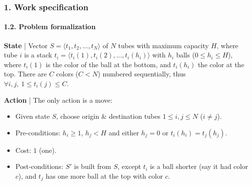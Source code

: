 \documentclass{beamer}
\begin{document}
\begin{frame}
\frametitle{1. Work specification}
\framesubtitle{1.2. Problem formalization}

\textbf{State} | Vector $S = \langle t_1, t_2, ..., t_N \rangle$ of $N$ tubes with maximum capacity $H$, where tube $i$ is a stack $t_i = \langle t_i(1), t_i(2), ..., t_i(h_i) \rangle$ with $h_i$ balls ($0 \leq h_i \leq H$), where $t_i(1)$ is the color of the ball at the bottom, and $t_i(h_i)$ the color at the top. There are $C$ colors ($C < N$) numbered sequentially, thus $\forall i, j,~1 \leq t_i(j) \leq C$.

\textbf{Action} | The only action is a move:
\begin{itemize}
  \item Given state $S$, choose origin \& destination tubes $1 \leq i, j \leq N$ ($i \neq j$).
  \item Pre-conditions: $h_i \geq 1$, $h_j < H$ and either $h_j = 0$ or $t_i(h_i)=t_j(h_j)$.
  \item Cost: $1$ (one).
  \item Post-conditions: $S'$ is built from $S$, except $t_i$ is a ball shorter (say it had color $c$), and $t_j$ has one more ball at the top with color $c$.
\end{itemize}


\end{frame}
\end{document}
